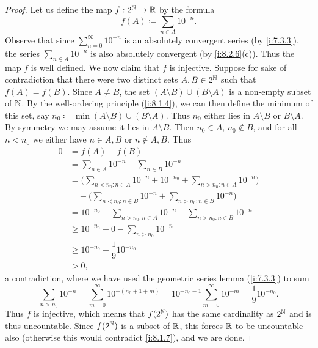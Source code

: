 \begin{proof}
  Let us define the map \(f : 2^{\mathbb{N}} \to \mathbb{R}\) by the formula
  \[
    f(A) \coloneqq \sum_{n \in A} 10^{-n}.
  \]
  Observe that since \(\sum_{n = 0}^\infty 10^{-n}\) is an absolutely convergent series (by \cref{i:7.3.3}), the series \(\sum_{n \in A} 10^{-n}\) is also absolutely convergent (by \cref{i:8.2.6}(c)).
  Thus the map \(f\)  is well defined.
  We now claim that \(f\) is injective.
  Suppose for sake of contradiction that there were two distinct sets \(A, B \in 2^{\mathbb{N}}\) such that \(f(A) = f(B)\).
  Since \(A \neq B\), the set \((A \setminus B) \cup (B \setminus A)\) is a non-empty subset of \(\mathbb{N}\).
  By the well-ordering principle (\cref{i:8.1.4}), we can then define the minimum of this set, say \(n_0 \coloneqq \min(A \setminus B) \cup (B \setminus A)\).
  Thus \(n_0\) either lies in \(A \setminus B\) or \(B \setminus A\).
  By symmetry we may assume it lies in \(A \setminus B\).
  Then \(n_0 \in A\), \(n_0 \notin B\), and for all \(n < n_0\) we either have \(n \in A, B\) or \(n \notin A, B\).
  Thus
  \begin{align*}
    0 & = f(A) - f(B)                                                                                 \\
      & = \sum_{n \in A} 10^{-n} - \sum_{n \in B} 10^{-n}                                             \\
      & = \Bigg(\sum_{n < n_0 : n \in A} 10^{-n} + 10^{-n_0} + \sum_{n > n_0 : n \in A} 10^{-n}\Bigg) \\
      & \quad - \Bigg(\sum_{n < n_0 : n \in B} 10^{-n} + \sum_{n > n_0 : n \in B} 10^{-n}\Bigg)       \\
      & = 10^{-n_0} + \sum_{n > n_0 : n \in A} 10^{-n} - \sum_{n > n_0 : n \in B} 10^{-n}             \\
      & \geq 10^{-n_0} + 0 - \sum_{n > n_0} 10^{-n}                                                   \\
      & \geq 10^{-n_0} - \dfrac{1}{9} 10^{-n_0}                                                       \\
      & > 0,
  \end{align*}
  a contradiction, where we have used the geometric series lemma (\cref{i:7.3.3}) to sum
  \[
    \sum_{n > n_0} 10^{-n} = \sum_{m = 0}^\infty 10^{-(n_0 + 1 + m)} = 10^{-n_0 - 1} \sum_{m = 0}^\infty 10^{-m} = \dfrac{1}{9} 10^{-n_0}.
  \]
  Thus \(f\) is injective, which means that \(f(2^{\mathbb{N}})\) has the same cardinality as \(2^{\mathbb{N}}\) and is thus uncountable.
  Since \(f(2^{\mathbb{N}})\) is a subset of \(\mathbb{R}\), this forces \(\mathbb{R}\) to be uncountable also (otherwise this would contradict \cref{i:8.1.7}), and we are done.
\end{proof}

